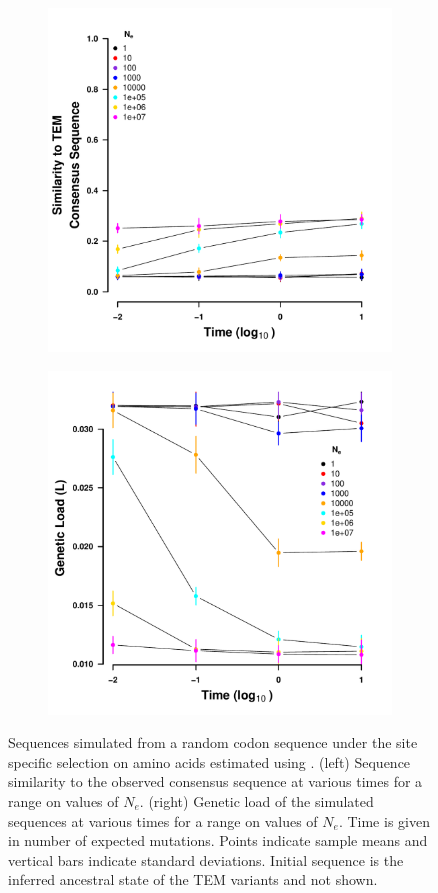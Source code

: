 \documentclass[12pt]{article}
\begin{document}
\begin{figure}[h]
    \centering
    \begin{subfigure}
        \centering
        \includegraphics[width=.45\textwidth]{img/simulated_dist_time_SELAC_random.pdf}
    \end{subfigure}
    \begin{subfigure}
        \centering
        \includegraphics[width=.45\textwidth]{img/simulated_gl_time_SELAC_random.pdf}
    \end{subfigure}
    \caption{{Sequences simulated from a random codon sequence under the site specific selection on amino acids estimated using \selac. 
    (left) Sequence similarity to the observed consensus sequence at various times for a range on values of $N_e$.
    (right) Genetic load of the simulated sequences at various times for a range on values of $N_e$.
    Time is given in number of expected mutations.
    Points indicate sample means and vertical bars indicate standard deviations. Initial sequence is the inferred ancestral state of the TEM variants and not shown.}}
    \label{fig:selac_sim_rand}
\end{figure}
\end{document}
